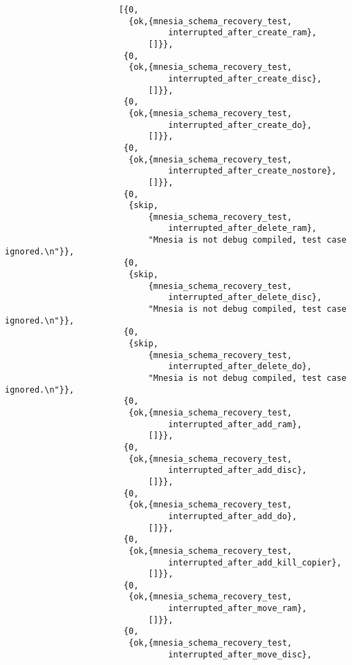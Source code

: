 \begin{verbatim}
                       [{0,
                         {ok,{mnesia_schema_recovery_test,
                                 interrupted_after_create_ram},
                             []}},
                        {0,
                         {ok,{mnesia_schema_recovery_test,
                                 interrupted_after_create_disc},
                             []}},
                        {0,
                         {ok,{mnesia_schema_recovery_test,
                                 interrupted_after_create_do},
                             []}},
                        {0,
                         {ok,{mnesia_schema_recovery_test,
                                 interrupted_after_create_nostore},
                             []}},
                        {0,
                         {skip,
                             {mnesia_schema_recovery_test,
                                 interrupted_after_delete_ram},
                             "Mnesia is not debug compiled, test case ignored.\n"}},
                        {0,
                         {skip,
                             {mnesia_schema_recovery_test,
                                 interrupted_after_delete_disc},
                             "Mnesia is not debug compiled, test case ignored.\n"}},
                        {0,
                         {skip,
                             {mnesia_schema_recovery_test,
                                 interrupted_after_delete_do},
                             "Mnesia is not debug compiled, test case ignored.\n"}},
                        {0,
                         {ok,{mnesia_schema_recovery_test,
                                 interrupted_after_add_ram},
                             []}},
                        {0,
                         {ok,{mnesia_schema_recovery_test,
                                 interrupted_after_add_disc},
                             []}},
                        {0,
                         {ok,{mnesia_schema_recovery_test,
                                 interrupted_after_add_do},
                             []}},
                        {0,
                         {ok,{mnesia_schema_recovery_test,
                                 interrupted_after_add_kill_copier},
                             []}},
                        {0,
                         {ok,{mnesia_schema_recovery_test,
                                 interrupted_after_move_ram},
                             []}},
                        {0,
                         {ok,{mnesia_schema_recovery_test,
                                 interrupted_after_move_disc},

\end{verbatim}
